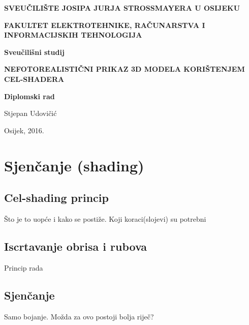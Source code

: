 \documentclass[a4paper,12pt]{extarticle}
\begin{document}
\begin{titlepage}
	\centering
	{\bfseries SVEUČILIŠTE JOSIPA JURJA STROSSMAYERA U OSIJEKU\par}
	{\bfseries FAKULTET ELEKTROTEHNIKE, RAČUNARSTVA I INFORMACIJSKIH TEHNOLOGIJA\par}
	
	\vspace{2cm}
	{\bfseries Sveučilišni studij\par}

	\vspace{4cm}
	{\huge\bfseries NEFOTOREALISTIČNI PRIKAZ 3D MODELA KORIŠTENJEM CEL-SHADERA\par}
	
	\vspace{1cm}
	{\bfseries Diplomski rad\par}
	
	\vspace{2cm}
	{\Large Stjepan Udovičić\par}
	
	\vfill
	{Osijek, 2016.\par}
\end{titlepage}

\tableofcontents










\section{Sjenčanje (shading)}

\subsection{Cel-shading princip}

Što je to uopće i kako se postiže. Koji koraci(slojevi) su potrebni

\subsection{Iscrtavanje obrisa i rubova}

Princip rada

\subsection{Sjenčanje}

Samo bojanje. Možda za ovo postoji bolja riječ?
\end{document}
